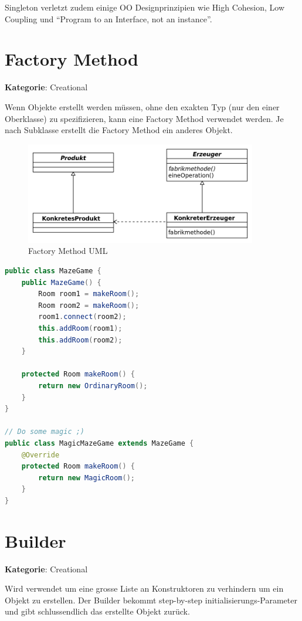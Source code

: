 Singleton verletzt zudem einige OO Designprinzipien wie High Cohesion, Low Coupling und ``Program to an Interface, not an instance''.

\section{Factory Method}
\textbf{Kategorie}: Creational

Wenn Objekte erstellt werden müssen, ohne den exakten Typ (nur den einer Oberklasse) zu spezifizieren, kann eine Factory Method verwendet werden.
Je nach Subklasse erstellt die Factory Method ein anderes Objekt.

\begin{figure}[H]
	\centering
	\includegraphics[width=0.9\textwidth]{content/gof/images/03-factory-method.png}
	\caption{Factory Method UML}
\end{figure}

\begin{lstlisting}[language=Java, caption={Factory Method}]
public class MazeGame {
	public MazeGame() {
		Room room1 = makeRoom();
		Room room2 = makeRoom();
		room1.connect(room2);
		this.addRoom(room1);
		this.addRoom(room2);
	}

	protected Room makeRoom() {
		return new OrdinaryRoom();
	}
}

// Do some magic ;)
public class MagicMazeGame extends MazeGame {
	@Override
	protected Room makeRoom() {
		return new MagicRoom();
	}
}
\end{lstlisting}

\section{Builder}

\textbf{Kategorie}: Creational

Wird verwendet um eine grosse Liste an Konstruktoren zu verhindern um ein Objekt zu erstellen. Der Builder bekommt step-by-step initialisierungs-Parameter und gibt schlussendlich das erstellte Objekt zurück.

